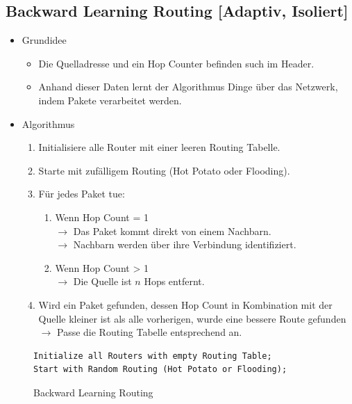 \documentclass[a4paper, 11pt, accentcolor = tud3b]{tudreport}
\begin{document}
            \subsection{Backward Learning Routing [Adaptiv, Isoliert]}
	            \begin{itemize}
	            	\item Grundidee
		            	\begin{itemize}
		            		\item Die Quelladresse und ein Hop Counter befinden such im Header.
		            		\item Anhand dieser Daten lernt der Algorithmus Dinge über das Netzwerk, indem Pakete verarbeitet werden.
		            	\end{itemize}
		            \item Algorithmus
			            \begin{enumerate}
			            	\item Initialisiere alle Router mit einer leeren Routing Tabelle.
			            	\item Starte mit zufälligem Routing (Hot Potato oder Flooding).
			            	\item Für jedes Paket tue:
				            	\begin{enumerate}
				            		\item Wenn Hop Count = 1
					            	   \\ \(\rightarrow\) Das Paket kommt direkt von einem Nachbarn.
					            	   \\ \(\rightarrow\) Nachbarn werden über ihre Verbindung identifiziert.
					            	\item Wenn Hop Count > 1
					            	   \\ \(\rightarrow\) Die Quelle ist \(n\) Hops entfernt.
				            	\end{enumerate}
				            \item Wird ein Paket gefunden, dessen Hop Count in Kombination mit der Quelle kleiner ist als alle vorherigen, wurde eine bessere Route gefunden
				               \\ \(\rightarrow\) Passe die Routing Tabelle entsprechend an.
			            \end{enumerate}
	            \end{itemize}
	            \begin{figure}[H]
	            	\centering
	            	\begin{lstlisting}
Initialize all Routers with empty Routing Table;
Start with Random Routing (Hot Potato or Flooding);
	            	\end{lstlisting}
	            	\caption{Backward Learning Routing}
	            \end{figure}
\end{document}
